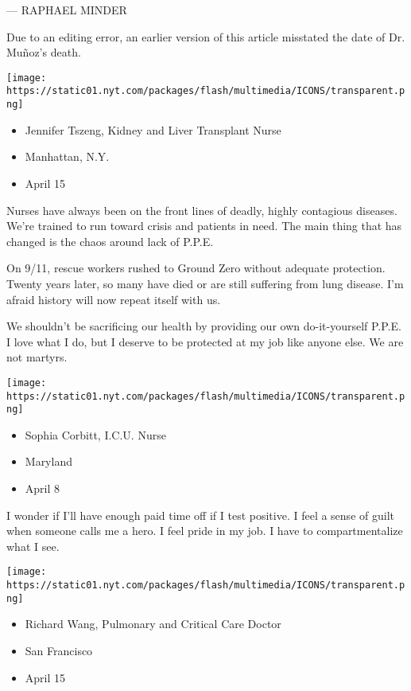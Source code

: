 --- RAPHAEL MINDER

Due to an editing error, an earlier version of this article misstated
the date of Dr. Muñoz's death.

\texttt{[image: https://static01.nyt.com/packages/flash/multimedia/ICONS/transparent.png]}

\begin{itemize}
\tightlist
\item
  Jennifer Tszeng, Kidney and Liver Transplant Nurse
\item
  Manhattan, N.Y.
\item
  April 15
\end{itemize}

Nurses have always been on the front lines of deadly, highly contagious
diseases. We're trained to run toward crisis and patients in need. The
main thing that has changed is the chaos around lack of P.P.E.

On 9/11, rescue workers rushed to Ground Zero without adequate
protection. Twenty years later, so many have died or are still suffering
from lung disease. I'm afraid history will now repeat itself with us.

We shouldn't be sacrificing our health by providing our own
do-it-yourself P.P.E. I love what I do, but I deserve to be protected at
my job like anyone else. We are not martyrs.

\texttt{[image: https://static01.nyt.com/packages/flash/multimedia/ICONS/transparent.png]}

\begin{itemize}
\tightlist
\item
  Sophia Corbitt, I.C.U. Nurse
\item
  Maryland
\item
  April 8
\end{itemize}

I wonder if I'll have enough paid time off if I test positive. I feel a
sense of guilt when someone calls me a hero. I feel pride in my job. I
have to compartmentalize what I see.

\texttt{[image: https://static01.nyt.com/packages/flash/multimedia/ICONS/transparent.png]}

\begin{itemize}
\tightlist
\item
  Richard Wang, Pulmonary and Critical Care Doctor
\item
  San Francisco
\item
  April 15
\end{itemize}

